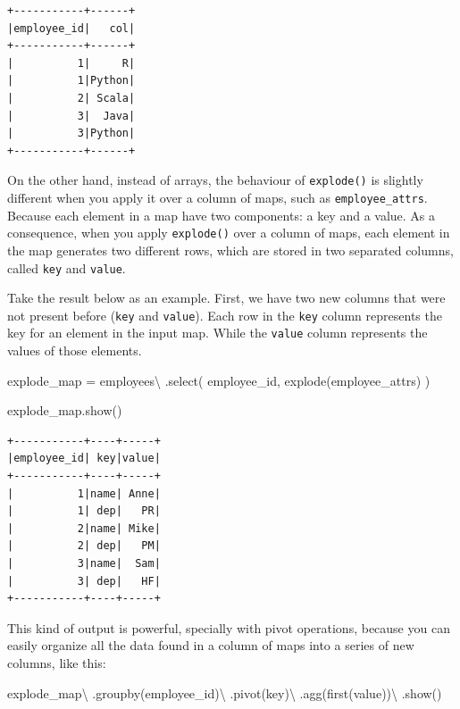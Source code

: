 \documentclass[
  11pt,
  letterpaper,
  DIV=11,
  numbers=noendperiod]{scrreprt}
\newenvironment{Shaded}{\begin{snugshade}}{\end{snugshade}}
\newcommand{\NormalTok}[1]{\textcolor[rgb]{0.00,0.23,0.31}{#1}}
\newcommand{\OperatorTok}[1]{\textcolor[rgb]{0.37,0.37,0.37}{#1}}
\newcommand{\StringTok}[1]{\textcolor[rgb]{0.13,0.47,0.30}{#1}}
\begin{document}
\begin{verbatim}
+-----------+------+
|employee_id|   col|
+-----------+------+
|          1|     R|
|          1|Python|
|          2| Scala|
|          3|  Java|
|          3|Python|
+-----------+------+
\end{verbatim}

On the other hand, instead of arrays, the behaviour of
\texttt{explode()} is slightly different when you apply it over a column
of maps, such as \texttt{employee\_attrs}. Because each element in a map
have two components: a key and a value. As a consequence, when you apply
\texttt{explode()} over a column of maps, each element in the map
generates two different rows, which are stored in two separated columns,
called \texttt{key} and \texttt{value}.

Take the result below as an example. First, we have two new columns that
were not present before (\texttt{key} and \texttt{value}). Each row in
the \texttt{key} column represents the key for an element in the input
map. While the \texttt{value} column represents the values of those
elements.

\begin{Shaded}
\begin{Highlighting}[]
\NormalTok{explode\_map }\OperatorTok{=}\NormalTok{ employees}\OperatorTok{\textbackslash{}}
\NormalTok{    .select(}
        \StringTok{\textquotesingle{}employee\_id\textquotesingle{}}\NormalTok{,}
\NormalTok{        explode(}\StringTok{\textquotesingle{}employee\_attrs\textquotesingle{}}\NormalTok{)}
\NormalTok{    )}

\NormalTok{explode\_map.show()}
\end{Highlighting}
\end{Shaded}

\begin{verbatim}
+-----------+----+-----+
|employee_id| key|value|
+-----------+----+-----+
|          1|name| Anne|
|          1| dep|   PR|
|          2|name| Mike|
|          2| dep|   PM|
|          3|name|  Sam|
|          3| dep|   HF|
+-----------+----+-----+
\end{verbatim}

This kind of output is powerful, specially with pivot operations,
because you can easily organize all the data found in a column of maps
into a series of new columns, like this:

\begin{Shaded}
\begin{Highlighting}[]
\NormalTok{explode\_map}\OperatorTok{\textbackslash{}}
\NormalTok{    .groupby(}\StringTok{\textquotesingle{}employee\_id\textquotesingle{}}\NormalTok{)}\OperatorTok{\textbackslash{}}
\NormalTok{    .pivot(}\StringTok{\textquotesingle{}key\textquotesingle{}}\NormalTok{)}\OperatorTok{\textbackslash{}}
\NormalTok{    .agg(first(}\StringTok{\textquotesingle{}value\textquotesingle{}}\NormalTok{))}\OperatorTok{\textbackslash{}}
\NormalTok{    .show()}
\end{Highlighting}
\end{Shaded}
\end{document}
